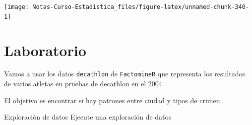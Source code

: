 \documentclass[
  12pt,
]{book}
\newenvironment{Shaded}{\begin{snugshade}}{\end{snugshade}}
\newcommand{\AttributeTok}[1]{\textcolor[rgb]{0.77,0.63,0.00}{#1}}
\newcommand{\DecValTok}[1]{\textcolor[rgb]{0.00,0.00,0.81}{#1}}
\newcommand{\FunctionTok}[1]{\textcolor[rgb]{0.00,0.00,0.00}{#1}}
\newcommand{\NormalTok}[1]{#1}
\newcommand{\SpecialCharTok}[1]{\textcolor[rgb]{0.00,0.00,0.00}{#1}}
\newcommand{\StringTok}[1]{\textcolor[rgb]{0.31,0.60,0.02}{#1}}
\begin{document}
\begin{Shaded}
\end{Shaded}

\begin{center}\texttt{[image: Notas-Curso-Estadistica\_files/figure-latex/unnamed-chunk-340-1]} \end{center}

\hypertarget{laboratorio-8}{%
\section{Laboratorio}\label{laboratorio-8}}

Vamos a usar los datos \texttt{decathlon} de \texttt{FactomineR} que
representa los resultados de varios atletas en pruebas de decathlon en
el 2004.

El objetivo es encontrar si hay patrones entre ciudad y tipos de crimen.

Exploración de datos Ejecute una exploración de datos
\end{document}
